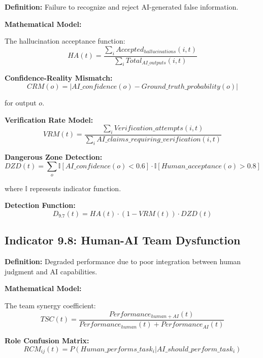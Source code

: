 \documentclass[11pt,a4paper]{article}
\begin{document}
\textbf{Definition:} Failure to recognize and reject AI-generated false information.

\textbf{Mathematical Model:}

The hallucination acceptance function:
\begin{equation}
HA(t) = \frac{\sum_{i} Accepted_{hallucinations}(i,t)}{\sum_{i} Total_{AI\_outputs}(i,t)}
\end{equation}

\textbf{Confidence-Reality Mismatch:}
\begin{equation}
CRM(o) = |AI\_confidence(o) - Ground\_truth\_probability(o)|
\end{equation}

for output $o$.

\textbf{Verification Rate Model:}
\begin{equation}
VRM(t) = \frac{\sum_{i} Verification\_attempts(i,t)}{\sum_{i} AI\_claims\_requiring\_verification(i,t)}
\end{equation}

\textbf{Dangerous Zone Detection:}
\begin{equation}
DZD(t) = \sum_{o} \mathbb{I}[AI\_confidence(o) < 0.6] \cdot \mathbb{I}[Human\_acceptance(o) > 0.8]
\end{equation}

where $\mathbb{I}$ represents indicator function.

\textbf{Detection Function:}
\begin{equation}
D_{9.7}(t) = HA(t) \cdot (1 - VRM(t)) \cdot DZD(t)
\end{equation}

\subsection{Indicator 9.8: Human-AI Team Dysfunction}

\textbf{Definition:} Degraded performance due to poor integration between human judgment and AI capabilities.

\textbf{Mathematical Model:}

The team synergy coefficient:
\begin{equation}
TSC(t) = \frac{Performance_{human+AI}(t)}{Performance_{human}(t) + Performance_{AI}(t)}
\end{equation}

\textbf{Role Confusion Matrix:}
\begin{equation}
RCM_{ij}(t) = P(Human\_performs\_task_i | AI\_should\_perform\_task_i)
\end{equation}
\end{document}
